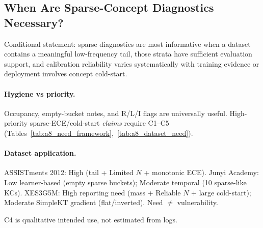 \subsection{When Are Sparse-Concept Diagnostics Necessary?}
\label{sec:a8_when_needed}

Conditional statement: sparse diagnostics are most informative when a dataset contains a meaningful low-frequency tail, those strata have sufficient evaluation support, and calibration reliability varies systematically with training evidence or deployment involves concept cold-start.

\paragraph{Hygiene vs priority.}
Occupancy, empty-bucket notes, and R/L/I flags are universally useful. High-priority sparse-ECE/cold-start \emph{claims} require C1--C5 (Tables~\ref{tab:a8_need_framework},~\ref{tab:a8_dataset_need}).

\paragraph{Dataset application.}
ASSISTments 2012: High (tail + Limited $N$ + monotonic ECE).
Junyi Academy: Low learner-based (empty sparse buckets); Moderate temporal (10 sparse-like KCs).
XES3G5M: High reporting need (mass + Reliable $N$ + large cold-start); Moderate SimpleKT gradient (flat/inverted). Need $\neq$ vulnerability.

C4 is qualitative intended use, not estimated from logs.
